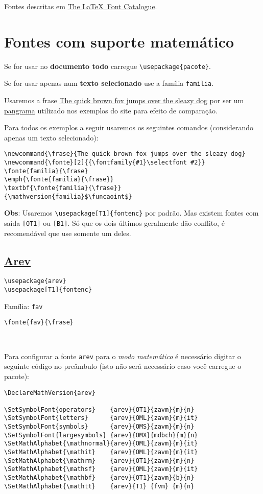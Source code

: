 \documentclass[a4paper]{article}
\newcommand{\frase}{The quick brown fox jumps over the sleazy dog}
\newcommand{\funcaoint}{
  \mathbf{B}(P)=\frac{\mu_0}{4\pi}\int\frac{\mathbf{I}\times\hat{r}'}{r'^2}dl = \frac{\mu_0}{4\pi}\,I\!\int\frac{dl\times\hat{r}'}{r'^2}
}
\newcommand{\fonte}[2]{
  {\fontfamily{#1}\selectfont #2}
}
\begin{document}
Fontes descritas em \href{http://www.tug.dk/FontCatalogue/}{The \LaTeX\ Font Catalogue}.

\section*{Fontes com suporte matemático}

Se for usar no \textbf{documento todo} carregue \verb|\usepackage{pacote}|.

Se for usar apenas num \textbf{texto selecionado} use a família \texttt{familia}.

Usaremos a frase \href{http://pt.wikipedia.org/wiki/The_quick_brown_fox_jumps_over_the_lazy_dog}{The quick brown fox jumps over the sleazy dog} por ser um \href{http://pt.wikipedia.org/wiki/Pangrama}{pangrama} utilizado nos exemplos do site para efeito de comparação.

Para todos os exemplos a seguir usaremos os seguintes comandos (considerando apenas um texto selecionado):

\begin{verbatim}
\newcommand{\frase}{The quick brown fox jumps over the sleazy dog}
\newcommand{\fonte}[2]{{\fontfamily{#1}\selectfont #2}}
\fonte{familia}{\frase}
\emph{\fonte{familia}{\frase}}
\textbf{\fonte{familia}{\frase}}
{\mathversion{familia}$\funcaoint$}
\end{verbatim}

\textbf{Obs}: Usaremos \verb|\usepackage[T1]{fontenc}| por padrão. Mas existem fontes com saída \verb|[OT1]| ou \verb|[B1]|. Só que os dois últimos geralmente dão conflito, é recomendável que use somente um deles.

\subsection*{\href{http://www.tug.dk/FontCatalogue/arev/}{Arev}}

\begin{verbatim}
\usepackage{arev}
\usepackage[T1]{fontenc}
\end{verbatim}

Família: \texttt{fav}

\verb|\fonte{fav}{\frase}|

\

Para configurar a fonte \texttt{arev} para o \textit{modo matemático} é necessário digitar o seguinte código no preâmbulo (isto não será necessário caso você carregue o pacote):

\begin{verbatim}
\DeclareMathVersion{arev}

\SetSymbolFont{operators}    {arev}{OT1}{zavm}{m}{n}
\SetSymbolFont{letters}      {arev}{OML}{zavm}{m}{it}
\SetSymbolFont{symbols}      {arev}{OMS}{zavm}{m}{n}
\SetSymbolFont{largesymbols} {arev}{OMX}{mdbch}{m}{n}
\SetMathAlphabet{\mathnormal}{arev}{OML}{zavm}{m}{it}
\SetMathAlphabet{\mathit}    {arev}{OML}{zavm}{m}{it}
\SetMathAlphabet{\mathrm}    {arev}{OT1}{zavm}{m}{n}
\SetMathAlphabet{\mathsf}    {arev}{OML}{zavm}{m}{it}
\SetMathAlphabet{\mathbf}    {arev}{OT1}{zavm}{b}{n}
\SetMathAlphabet{\mathtt}    {arev}{T1} {fvm} {m}{n}
\end{verbatim}
\end{document}
